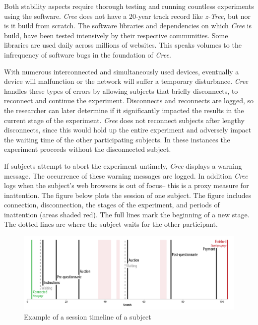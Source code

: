 \documentclass[preprint, 12pt]{elsarticle}
\newcommand{\Cree}{\emph{Cree}\xspace}
\begin{document}
Both stability aspects require thorough testing and running countless experiments using the software. \Cree does not have a 20-year track record like \emph{z-Tree}, but nor is it build from scratch. The software libraries and dependencies on which \Cree is build, have been tested intensively by their respective communities. Some libraries are used daily across millions of websites\footnotemark[6]. This speaks volumes to the infrequency of software bugs in the foundation of \Cree.


With numerous interconnected and simultaneously used devices, eventually a device will malfunction or the network will suffer a temporary disturbance. \Cree handles these types of errors by allowing subjects that briefly disconnects, to reconnect and continue the experiment. Disconnects and reconnects are logged, so the researcher can later determine if it significantly impacted the results in the current stage of the experiment. \Cree does not reconnect subjects after lengthy disconnects, since this would hold up the entire experiment and adversely impact the waiting time of the other participating subjects. In these instances the experiment proceeds without the disconnected subject.

If subjects attempt to abort the experiment untimely, \Cree displays a warning message. The occurrence of these warning messages are logged. In addition \Cree logs when the subject's web browsers is out of focus\footnotemark[7] -- this is a proxy measure for inattention. The figure below plots the session of one subject. The figure includes connection, disconnection, the stages of the experiment, and periods of inattention (areas shaded red). The full lines mark the beginning of a new stage. The dotted lines are where the subject waits for the other participant.

\begin{figure}[h!]
  \caption{Example of a session timeline of a subject}
  \centering
    \includegraphics[width=\textwidth]{figures/example_session}
\end{figure}
\end{document}
